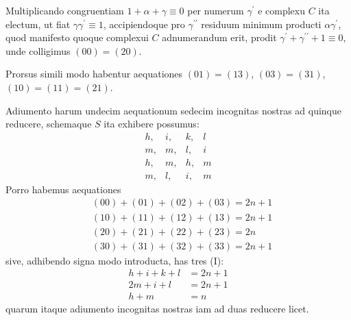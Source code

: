 \documentclass[twoside,12pt, showframe]{memoir}
\begin{document}
Multiplicando congruentiam \(1+\alpha+\gamma \equiv 0\) per numerum \(\gamma^{\prime}\) e complexu \(C\) ita electum, ut fiat \(\gamma \gamma^{\prime} \equiv 1\), accipiendoque pro \(\gamma^{\prime \prime}\) residuum minimum producti \(\alpha \gamma^{\prime}\), quod manifesto quoque complexui \(C\) adnumerandum erit, prodit \(\gamma^{\prime}+\gamma^{\prime \prime}+1 \equiv 0\), unde colligimus \((00)=(20)\).
 
Prorsus simili modo habentur aequationes \((01)=(13)\), \((03)=(31)\), \((10)=(11)=(21)\).

Adiumento harum undecim aequationum sedecim incognitas nostras ad quinque reducere, schemaque \(S\) ita exhibere possumus:
\[\begin{array}{llll}
h,&  i,& k,& l \\
m,& m,& l,& i \\
h,& m,& h,& m \\
m,& l,&  i,&  m
\end{array}\]\clearpage\noindent%
Porro habemus aequationes
\[\begin{aligned}
& (00)+(01)+(02)+(03)=2 n+1 \\
& (10)+(11)+(12)+(13)=2 n+1 \\
& (20)+(21)+(22)+(23)=2 n \\
& (30)+(31)+(32)+(33)=2 n+1
\end{aligned}\]
sive, adhibendo signa modo introducta, has tres (I):
\[\begin{aligned}
h+i+k+l & =2 n+1 \\
2 m+i+l & =2 n+1 \\
h+m & =n
\end{aligned}\]
quarum itaque adiumento incognitas nostras iam ad duas reducere licet.
\end{document}
